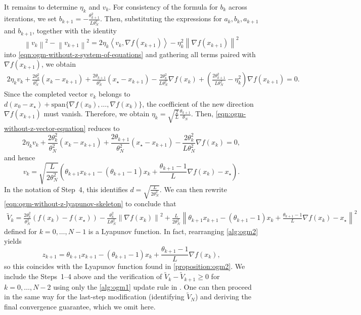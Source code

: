\documentclass{article}
\theoremstyle{definition}
\theoremstyle{plain}
\newcommand{\inprod}[2]{\left\langle #1,#2 \right\rangle}
\newcommand{\sqnorm}[1]{\left\| #1 \right\|^2}
\begin{document}
It remains to determine $\eta_k$ and $v_k$.
For consistency of the formula for $b_k$ across iterations, we set $b_{k+1}=-\frac{\theta_{k+1}^2}{L\theta_N^2}$.
Then, substituting the expressions for $a_k, b_k, a_{k+1}$ and $b_{k+1}$, together with the identity
\[
    \sqnorm{v_k}-\sqnorm{v_{k+1}}
    =
    2\eta_k\inprod{v_k}{\nabla f(x_{k+1})}
    -\eta_k^2\sqnorm{\nabla f(x_{k+1})}
\]
into \eqref{eqn:ogm-without-z-system-of-equations} and gathering all terms paired with $\nabla f(x_{k+1})$, we obtain
\begin{align}
\label{eqn:ogm-without-z-vector-equation}
    2\eta_k v_k
    + \frac{2\theta_k^2}{\theta_N^2}(x_k-x_{k+1})
    + \frac{2\theta_{k+1}}{\theta_N^2}(x_\star-x_{k+1})
    - \frac{2\theta_k^2}{L\theta_N^2}\nabla f(x_k)
    + \left(\frac{2\theta_{k+1}^2}{L\theta_N^2}-\eta_k^2\right)\nabla f(x_{k+1})
    = 0.
\end{align}
Since the completed vector $v_k$ belongs to $d(x_0-x_\star)+\mathrm{span}\{\nabla f(x_0),\dots,\nabla f(x_k)\}$, the coefficient of the new direction $\nabla f(x_{k+1})$ must vanish.
Therefore, we obtain $\eta_k = \sqrt{\frac{2}{L}}\frac{\theta_{k+1}}{\theta_N}$.
Then, \eqref{eqn:ogm-without-z-vector-equation} reduces to
\[
    2\eta_k v_k
    + \frac{2\theta_k^2}{\theta_N^2}(x_k-x_{k+1})
    + \frac{2\theta_{k+1}}{\theta_N^2}(x_\star-x_{k+1})
    - \frac{2\theta_k^2}{L\theta_N^2}\nabla f(x_k)
    =0,
\]
and hence
\[
    v_k
    =
    \sqrt{\frac{L}{2\theta_N^2}}
    \left(
        \theta_{k+1}x_{k+1}
        -(\theta_{k+1}-1)x_k
        + \frac{\theta_{k+1}-1}{L}\nabla f(x_k)
        -x_\star
    \right) .
\]
In the notation of Step~4, this identifies $d = \sqrt{\frac{L}{2\theta_N^2}}$.
We can then rewrite \eqref{eqn:ogm-without-z-lyapunov-skeleton} to conclude that
\begin{align*}
    \widetilde V_k = \frac{2\theta_k^2}{\theta_N^2} (f(x_k) - f(x_\star)) - \frac{\theta_k^2}{L\theta_N^2} \sqnorm{\nabla f(x_k)}
    + \frac{L}{2\theta_N^2} \sqnorm{
        \theta_{k+1}x_{k+1}
        -(\theta_{k+1}-1)x_k
        + \frac{\theta_{k+1}-1}{L}\nabla f(x_k)
        -x_\star
    }
\end{align*}
defined for $k=0,\dots,N-1$ is a Lyapunov function.
In fact, rearranging \eqref{alg:ogm2} yields
\[
    z_{k+1}
    =
    \theta_{k+1}x_{k+1}
    -(\theta_{k+1}-1)x_k
    +\frac{\theta_{k+1}-1}{L}\nabla f(x_k),
\]
so this coincides with the Lyapunov function found in \cref{proposition:ogm2}.
We include the Steps~1--4 above and the verification of $\widetilde V_k - \widetilde V_{k+1} \ge 0$ for $k=0,\dots,N-2$ using only the \ref{alg:ogm1} update rule in .
One can then proceed in the same way for the last-step modification (identifying $\widetilde V_N$) and deriving the final convergence guarantee, which we omit here.
\end{document}
